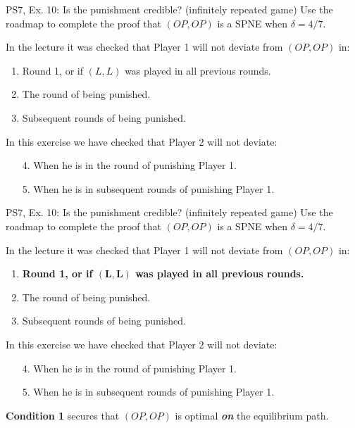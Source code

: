 \begin{frame}{PS7, Ex. 10: Is the punishment credible? (infinitely repeated game)}
  Use the roadmap to complete the proof that $(OP,OP)$ is a SPNE when $\delta=4/7$.\vspace{-4pt}
  \begin{multicols}{2}
    In the lecture it was checked that Player 1 will not deviate from $(OP,OP)$ in:
    \begin{enumerate}
      \item Round 1, or if $(L,L)$ was played in all previous rounds.
      \item The  round of being punished.
      \item Subsequent rounds of being punished.
    \end{enumerate}
    In this exercise we have checked that Player 2 will not deviate:
    \begin{itemize}
      \item[4.] When he is in the  round of punishing Player 1.
      \item[5.] When he is in subsequent rounds of punishing Player 1.
    \end{itemize}
    \vfill\null\columnbreak
    \vfill\null
  \end{multicols}
  \vfill\null
\end{frame}
\begin{frame}{PS7, Ex. 10: Is the punishment credible? (infinitely repeated game)}
  Use the roadmap to complete the proof that $(OP,OP)$ is a SPNE when $\delta=4/7$.\vspace{-4pt}
  \begin{multicols}{2}
    In the lecture it was checked that Player 1 will not deviate from $(OP,OP)$ in:
    \begin{enumerate}
      \item \textbf{Round 1, or if $\bm{(L,L)}$ was played in all previous rounds.}
      \item The  round of being punished.
      \item Subsequent rounds of being punished.
    \end{enumerate}
    In this exercise we have checked that Player 2 will not deviate:
    \begin{itemize}
      \item[4.] When he is in the  round of punishing Player 1.
      \item[5.] When he is in subsequent rounds of punishing Player 1.
    \end{itemize}
    \vfill\null\columnbreak
    \textbf{Condition 1} secures that $(OP,OP)$ is optimal \textbf{\textit{on}} the equilibrium path.
    \vfill\null
  \end{multicols}
  \vfill\null
\end{frame}
